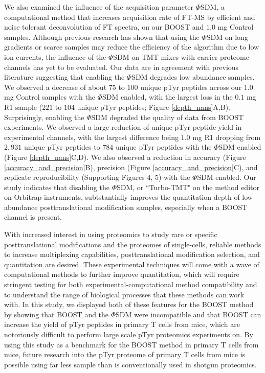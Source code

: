 \documentclass[journal=jprobs,manuscript=article]{achemso}
\begin{document}
We also examined the influence of the acquisition parameter $\Phi$SDM, a computational method that increases acquisition rate of FT-MS by efficient and noise tolerant deconvolution of FT spectra\cite{grinfeld2017phase}, on our BOOST and $1.0$ mg Control samples. Although previous research has shown that using the $\Phi$SDM on long gradients or scarce samples may reduce the efficiency of the algorithm due to low ion currents\cite{grinfeld2017phase,yu2020benchmarking,kelstrup2018limits}, the influence of the $\Phi$SDM on TMT mixes with carrier proteome channels has yet to be evaluated. Our data are in agreement with previous literature suggesting that enabling the $\Phi$SDM degrades low abundance samples. We observed a decrease of about $75$ to $100$ unique pTyr peptides across our $1.0$ mg Control samples with the $\Phi$SDM enabled, with the largest loss in the $0.1$ mg R1 sample ($221$ to $104$ unique pTyr peptides; Figure \ref{depth_nans}A,B). Surprisingly, enabling the $\Phi$SDM degraded the quality of data from BOOST experiments. We observed a large reduction of unique pTyr peptide yield in experimental channels, with the largest difference being $1.0$ mg R1 dropping from $2{,}931$ unique pTyr peptides to $784$ unique pTyr peptides with the $\Phi$SDM enabled (Figure \ref{depth_nans}C,D). We also observed a reduction in accuracy (Figure \ref{accuracy_and_precision}B), precision (Figure \ref{accuracy_and_precision}C), and replicate reproducibility (Supporting Figures $4$, $5$) with the $\Phi$SDM enabled. Our study indicates that disabling the $\Phi$SDM, or ``Turbo-TMT" on the method editor on Orbitrap instruments, subtstantially improves the quantitation depth of low abundance posttranslational modification samples, especially when a BOOST channel is present.

With increased interest in using proteomics to study rare or specific posttranslational modifications\cite{millan2020histone,yao2019one,fulzele2018ubiquitin} and the proteomes of single-cells\cite{petelski2021multiplexed,cheung2021defining,vistain2021single}, reliable methods to increase multiplexing capabilities\cite{arul2018sample}, posttranslational modification selection\cite{pieroni2020enrichments}, and quantitation\cite{chua2020tandem,chua2021ovalbumin,pino2020acquiring} are desired. These experimental techniques will come with a wave of computational methods to further improve quantitation\cite{grinfeld2017phase,sinitcyn2021maxdia,bilbao2018algorithm}, which will require stringent testing for both experimental-computational method compatibility and to understand the range of biological processes that these methods can work with. In this study, we displayed both of these features for the BOOST method by showing that BOOST and the $\Phi$SDM were incompatible and that BOOST can increase the yield of pTyr peptides in primary T cells from mice, which are notoriously difficult to perform large scale pTyr proteomics experiments on\cite{locard2020lymphoatlas}. By using this study as a benchmark for the BOOST method in primary T cells from mice, future research into the pTyr proteome of primary T cells from mice is possible using far less sample than is conventionally used in shotgun proteomics.
\end{document}
